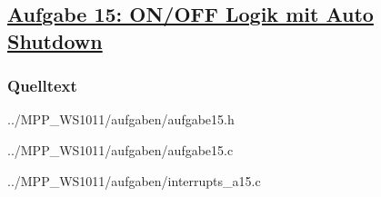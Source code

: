 \subsection
{\href{http://cst.mi.fu-berlin.de/intern/19606-P-MPP/Aufgaben/040502.html}
{Aufgabe 15: ON/OFF Logik mit Auto Shutdown}}

\subsubsection*{Quelltext}

{../MPP_WS1011/aufgaben/aufgabe15.h}


{../MPP_WS1011/aufgaben/aufgabe15.c}


{../MPP_WS1011/aufgaben/interrupts_a15.c}
